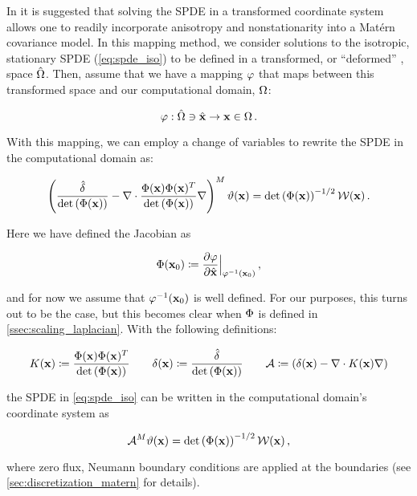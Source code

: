 In \citet{RSSB:RSSB777} it is suggested that solving the SPDE in a transformed
coordinate system allows one to readily incorporate anisotropy and
nonstationarity into a Mat\'ern covariance model.
In this mapping method, we consider solutions to the isotropic, stationary SPDE
(\ref{eq:spde_iso}) to be defined in a transformed, or
``deformed'' \citep{sampson_nonparametric_1992}, space $\hat{\Omega}$.
Then, assume that we have a mapping $\varphi$ that maps between this transformed space
and our computational domain, $\Omega$:
\begin{linenomath*}\begin{equation*}
    \varphi : \hat{\Omega}\ni\hat{\mathbf{x}} \rightarrow \mathbf{x}\in\Omega \, .
\end{equation*}\end{linenomath*}
With this mapping, we can employ a change of variables
\citep{smith_change_1934} to rewrite the SPDE in the computational domain as:
\begin{linenomath*}\begin{equation*}
    \left(\dfrac{\hat{\delta}}{\text{det}\left(\Phi(\mathbf{x})\right)} -
    \nabla\cdot
    \dfrac{\Phi(\mathbf{x})\Phi(\mathbf{x})^T}{\text{det}\left(\Phi(\mathbf{x})\right)}
    \nabla\right)^M\vartheta(\mathbf{x}) =
    \text{det}\left(\Phi(\mathbf{x})\right)^{-1/2}\mathcal{W}(\mathbf{x}) \, .
\end{equation*}\end{linenomath*}
Here we have defined the Jacobian as
\begin{linenomath*}\begin{equation*}
    \Phi(\mathbf{x}_0) \coloneqq
    \dfrac{\partial \varphi}{\partial \hat{\mathbf{x}}}\Big|_{\varphi^{-1}(\mathbf{x}_{0})} \, ,
\end{equation*}\end{linenomath*}
and for now we assume that $\varphi^{-1}(\mathbf{x}_0)$ is well defined.
For our purposes, this turns out to be the case, but this becomes clear when
$\Phi$ is defined in \cref{ssec:scaling_laplacian}.
With the following definitions:
\begin{linenomath*}\begin{equation}
        K(\mathbf{x}) \coloneqq
        \dfrac{\Phi(\mathbf{x})\Phi(\mathbf{x})^T}{\text{det}\left(\Phi(\mathbf{x})\right)}
        \qquad
        \delta(\mathbf{x}) \coloneqq \dfrac{\hat{\delta}}{\text{det}\left(\Phi(\mathbf{x})\right)}
        \qquad
        \mathcal{A} \coloneqq \left(\delta(\mathbf{x}) - \nabla\cdot K(\mathbf{x})\nabla\right)
    \label{eq:matern_definitions}
\end{equation}\end{linenomath*}
the SPDE in \cref{eq:spde_iso} can be written in the computational domain's coordinate system as
\begin{linenomath*}\begin{equation}
    \mathcal{A}^M \vartheta(\mathbf{x}) =
    \text{det}\left(\Phi(\mathbf{x})\right)^{-1/2}\mathcal{W}(\mathbf{x}) \, ,
    \label{eq:spde_general}
\end{equation}\end{linenomath*}
where zero flux, Neumann boundary conditions are applied at the boundaries
(see \cref{sec:discretization_matern} for details).

